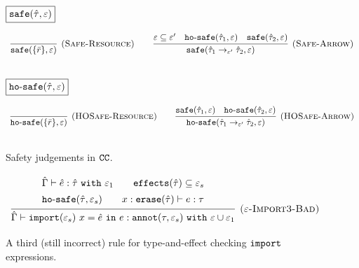 \begin{figure}

\noindent
$\fbox{$\mathtt{safe}(\hat \tau, \varepsilon)$}$

\[
\begin{array}{c}

\infer[\textsc{(Safe-Resource)}]
	{ \kwa{safe}(\{ \bar r \}, \varepsilon) }
	{} 
\hspace{5ex}
	
\infer[\textsc{(Safe-Arrow)}]
	{\kwa{safe}(\hat \tau_1 \rightarrow_{\varepsilon'} \hat \tau_2, \varepsilon)}
	{\varepsilon \subseteq \varepsilon' & \kwa{ho \hyphen safe}(\hat \tau_1, \varepsilon) & \kwa{safe}(\hat \tau_2, \varepsilon)} \\[3ex]

\end{array}
\]

\noindent
$\fbox{$\mathtt{ho \hbox{-} safe}(\hat \tau, \varepsilon)$}$

\[
\begin{array}{c}

\infer[\textsc{(HOSafe-Resource)}]
	{ \kwa{ho \hyphen safe}( \{ \bar r \}, \varepsilon)} 
	{}
\hspace{5ex}

\infer[\textsc{(HOSafe-Arrow)}]
	{ \kwa{ho \hyphen safe}( \hat \tau_1 \rightarrow_{\varepsilon'} \hat \tau_2, \varepsilon ) }
	{ \kwa{safe}(\hat \tau_1, \varepsilon)  & \kwa{ho \hyphen safe}(\hat \tau_2, \varepsilon) }\\[3ex]

\end{array}
\]

\vspace{-0.5cm}
\caption{Safety judgements in $\mathtt{CC}$.}
\vspace{-0.5cm}
\label{fig:safe_defns}
\end{figure}

\begin{figure}
\vspace{-0.6cm}

\[
\begin{array}{c}

\infer[\textsc{($\varepsilon$-Import3-Bad)}]
	{ \hat \Gamma \vdash \kwa{import}(\varepsilon_s)~x = \hat e~\kw{in} e: \kwa{annot}(\tau, \varepsilon_s)~\kw{with} \varepsilon \cup \varepsilon_1 }
{{\def\arraystretch{1.4}
  \begin{array}{c}
\hat \Gamma \vdash \hat e: \hat \tau~\kw{with} \varepsilon_1
~~~~~~
\kwa{effects}(\hat \tau) \subseteq \varepsilon_s \\
\hosafe{\hat \tau}{\varepsilon_s} ~~~~~~ x: \kwa{erase}(\hat \tau) \vdash e: \tau
  \end{array}}} 
 
\end{array}
\]

\vspace{-0.2cm}
\caption{A third (still incorrect) rule for type-and-effect checking $\mathtt{import}$ expressions.}
\vspace{-0.2cm}
\label{fig:import_rule3}
\end{figure}

